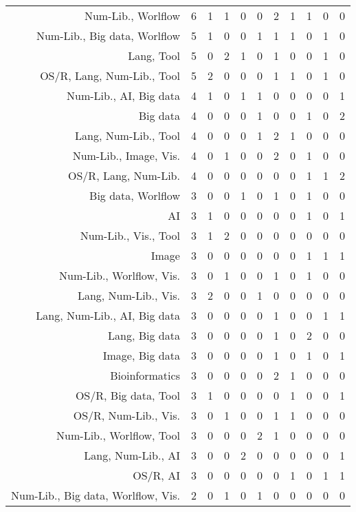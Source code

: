 {\begin{landscape}
\begin{longtable}[htb]{r|c|c|c|c|c|c|c|c|c|c}
{Num-Lib., Worlflow} & 6 & 1 & 1 & 0 & 0 & 2 & 1 & 1 & 0 & 0 \\%
{Num-Lib., Big data, Worlflow} & 5 & 1 & 0 & 0 & 1 & 1 & 1 & 0 & 1 & 0 \\%
{Lang, Tool} & 5 & 0 & 2 & 1 & 0 & 1 & 0 & 0 & 1 & 0 \\%
{OS/R, Lang, Num-Lib., Tool} & 5 & 2 & 0 & 0 & 0 & 1 & 1 & 0 & 1 & 0 \\%
{Num-Lib., AI, Big data} & 4 & 1 & 0 & 1 & 1 & 0 & 0 & 0 & 0 & 1 \\%
{Big data} & 4 & 0 & 0 & 0 & 1 & 0 & 0 & 1 & 0 & 2 \\%
{Lang, Num-Lib., Tool} & 4 & 0 & 0 & 0 & 1 & 2 & 1 & 0 & 0 & 0 \\%
{Num-Lib., Image, Vis.} & 4 & 0 & 1 & 0 & 0 & 2 & 0 & 1 & 0 & 0 \\%
{OS/R, Lang, Num-Lib.} & 4 & 0 & 0 & 0 & 0 & 0 & 0 & 1 & 1 & 2 \\%
{Big data, Worlflow} & 3 & 0 & 0 & 1 & 0 & 1 & 0 & 1 & 0 & 0 \\%
{AI} & 3 & 1 & 0 & 0 & 0 & 0 & 0 & 1 & 0 & 1 \\%
{Num-Lib., Vis., Tool} & 3 & 1 & 2 & 0 & 0 & 0 & 0 & 0 & 0 & 0 \\%
{Image} & 3 & 0 & 0 & 0 & 0 & 0 & 0 & 1 & 1 & 1 \\%
{Num-Lib., Worlflow, Vis.} & 3 & 0 & 1 & 0 & 0 & 1 & 0 & 1 & 0 & 0 \\%
{Lang, Num-Lib., Vis.} & 3 & 2 & 0 & 0 & 1 & 0 & 0 & 0 & 0 & 0 \\%
{Lang, Num-Lib., AI, Big data} & 3 & 0 & 0 & 0 & 0 & 1 & 0 & 0 & 1 & 1 \\%
{Lang, Big data} & 3 & 0 & 0 & 0 & 0 & 1 & 0 & 2 & 0 & 0 \\%
{Image, Big data} & 3 & 0 & 0 & 0 & 0 & 1 & 0 & 1 & 0 & 1 \\%
{Bioinformatics} & 3 & 0 & 0 & 0 & 0 & 2 & 1 & 0 & 0 & 0 \\%
{OS/R, Big data, Tool} & 3 & 1 & 0 & 0 & 0 & 0 & 1 & 0 & 0 & 1 \\%
{OS/R, Num-Lib., Vis.} & 3 & 0 & 1 & 0 & 0 & 1 & 1 & 0 & 0 & 0 \\%
{Num-Lib., Worlflow, Tool} & 3 & 0 & 0 & 0 & 2 & 1 & 0 & 0 & 0 & 0 \\%
{Lang, Num-Lib., AI} & 3 & 0 & 0 & 2 & 0 & 0 & 0 & 0 & 0 & 1 \\%
{OS/R, AI} & 3 & 0 & 0 & 0 & 0 & 0 & 1 & 0 & 1 & 1 \\%
{Num-Lib., Big data, Worlflow, Vis.} & 2 & 0 & 1 & 0 & 1 & 0 & 0 & 0 & 0 & 0 \\%

\end{longtable}
\end{landscape}}
